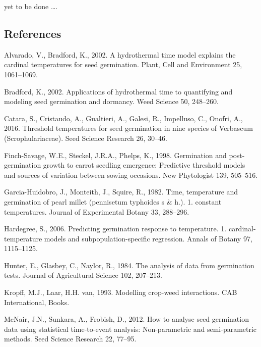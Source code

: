 \documentclass[a4paper,12pt]{article}
\begin{document}
yet to be done \ldots{}.

\subsection*{References}\label{references}

\hypertarget{refs}{}
\hypertarget{ref-Alvarado2002_Hydrotime}{}
Alvarado, V., Bradford, K., 2002. A hydrothermal time model explains the
cardinal temperatures for seed germination. Plant, Cell and Environment
25, 1061--1069.

\hypertarget{ref-Bradford2002_HydroTime}{}
Bradford, K., 2002. Applications of hydrothermal time to quantifying and
modeling seed germination and dormancy. Weed Science 50, 248--260.

\hypertarget{ref-catara_threshold_2016}{}
Catara, S., Cristaudo, A., Gualtieri, A., Galesi, R., Impelluso, C.,
Onofri, A., 2016. Threshold temperatures for seed germination in nine
species of Verbascum (Scrophulariaceae). Seed Science Research 26,
30--46.

\hypertarget{ref-Finch-Savage1998_HTTM}{}
Finch-Savage, W.E., Steckel, J.R.A., Phelps, K., 1998. Germination and
post-germination growth to carrot seedling emergence: Predictive
threshold models and sources of variation between sowing occasions. New
Phytologist 139, 505--516.

\hypertarget{ref-GarciaHuidibro1982_HTTM}{}
Garcia-Huidobro, J., Monteith, J., Squire, R., 1982. Time, temperature
and germination of pearl millet (pennisetum typhoides s \& h.). 1.
constant temperatures. Journal of Experimental Botany 33, 288--296.

\hypertarget{ref-Hardegree_2006}{}
Hardegree, S., 2006. Predicting germination response to temperature. 1.
cardinal-temperature models and subpopulation-specific regression.
Annals of Botany 97, 1115--1125.

\hypertarget{ref-Hunter1984_SeedGermMethod}{}
Hunter, E., Glasbey, C., Naylor, R., 1984. The analysis of data from
germination tests. Journal of Agricultural Science 102, 207--213.

\hypertarget{ref-kropff_modelling_1993}{}
Kropff, M.J., Laar, H.H. van, 1993. Modelling crop-weed interactions.
CAB International, Books.

\hypertarget{ref-McNair_2012SurvivalSeed}{}
McNair, J.N., Sunkara, A., Frobish, D., 2012. How to analyse seed
germination data using statistical time-to-event analysis:
Non-parametric and semi-parametric methods. Seed Science Research 22,
77--95.
\end{document}
